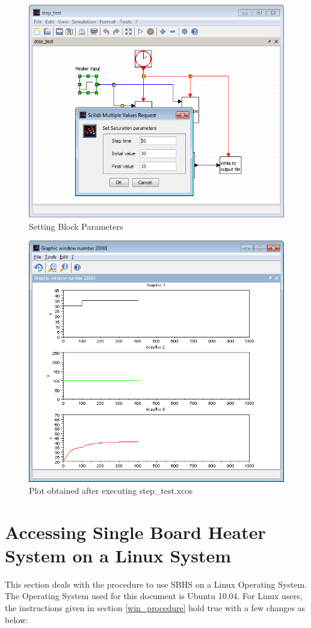 \begin{figure}
\centering
\includegraphics[width=0.7\linewidth]{using-sbhs/xcos_block.png}
\caption{Setting Block Parameters}
\label{blk_parameters}
\end{figure}


\begin{figure}
\centering
\includegraphics[width=0.7\linewidth]{using-sbhs/plot.png}
\caption{Plot obtained after executing step\_test.xcos}
\label{plots}
\end{figure}

\section{Accessing Single Board Heater System on a Linux System}
This section deals with the procedure to use SBHS on a Linux Operating System. The Operating System used for this document is Ubuntu 10.04.
For Linux users, the instructions given in section \ref{win_procedure} hold true with a few changes as below:

